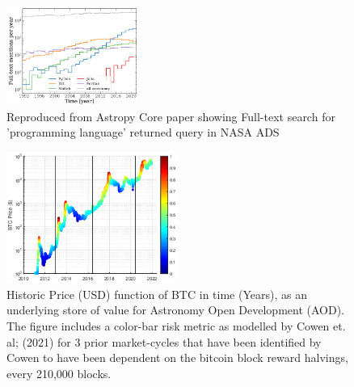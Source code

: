 \documentclass[final,5p,times,twocolumn,authoryear]{elsarticle}
\begin{document}
\begin{figure}
    \centering
    \label{fig:astropy}
    \includegraphics[width=0.38\textwidth]{figs/2206.14220.jpg}
    \vspace*{-0.3cm}
    \caption{Reproduced from Astropy Core paper showing Full-text search for 'programming language' returned query in NASA ADS}
\end{figure}

 \begin{figure}[h!]
    \centering
    \label{fig:cowen}
  \caption{Historic Price (USD) function of BTC in time (Years), as an underlying store of value for Astronomy Open Development (AOD). The figure includes a color-bar risk metric as modelled by Cowen et. al; (2021) for 3 prior market-cycles that have been identified by Cowen to have been dependent on the bitcoin block reward halvings, every 210,000 blocks.}
  \includegraphics[width=0.5\textwidth]{figs/cowen2.eps}
\end{figure}
\end{document}
